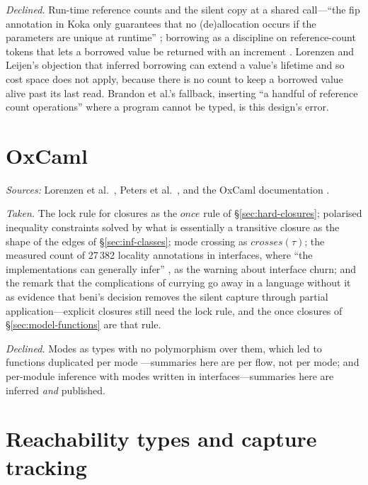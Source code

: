 \emph{Declined.} Run-time reference counts and the silent copy at a shared call---``the fip annotation
in Koka only guarantees that no (de)allocation occurs if the parameters are unique at runtime''
\citep[\S3.1]{lorenzen2024bst}; borrowing as a discipline on reference-count tokens that lets a borrowed
value be returned with an increment \citep{ullrich2019beans}. Lorenzen and Leijen's objection that
inferred borrowing can extend a value's lifetime and so cost space \citep{lorenzen2022frame} does not
apply, because there is no count to keep a borrowed value alive past its last read. Brandon et al.'s
fallback, inserting ``a handful of reference count operations'' where a program cannot be typed, is
this design's error.

\section{OxCaml}

\emph{Sources:} Lorenzen et al.\ \citep{lorenzen2024oxidizing}, Peters et al.\
\citep{peters2026mode}, and the OxCaml documentation \citep{oxcaml2025uniqueness}.

\emph{Taken.} The lock rule for closures \citep[\S3.3]{lorenzen2024oxidizing} as the $\mathit{once}$
rule of \S\ref{sec:hard-closures}; polarised inequality constraints solved by what is essentially a
transitive closure as the shape of the edges of \S\ref{sec:inf-classes}; mode crossing
\citep{peters2026mode} as $\mathit{crosses}(\tau)$; the measured count of 27\,382 locality annotations in
interfaces, where ``the implementations can generally infer'' \citep[\S7]{lorenzen2024oxidizing}, as the
warning about interface churn; and the remark that the complications of currying go away in a language
without it \citep[\S6.4]{lorenzen2024oxidizing} as evidence that beni's decision removes the silent
capture through partial application---explicit closures still need the lock rule, and the once closures of
\S\ref{sec:model-functions} are that rule.

\emph{Declined.} Modes as types with no polymorphism over them, which led to functions duplicated per
mode \citep[\S6.6]{lorenzen2024oxidizing}---summaries here are per flow, not per mode; and per-module
inference with modes written in interfaces---summaries here are inferred \emph{and} published.

\section{Reachability types and capture tracking}

